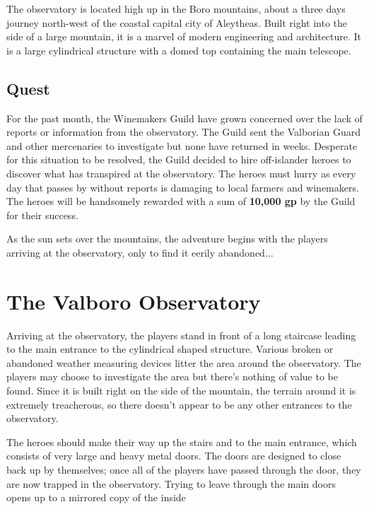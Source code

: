 \documentclass{article}
\begin{document}
\begin{multicols*}{2}
		The observatory is located high up in the Boro mountains, about a three days journey north-west of the coastal capital city of Aleytheas. Built right into the side of a large mountain, it is a marvel of modern engineering and architecture. It is a large cylindrical structure with a domed top containing the main telescope.
		
		\subsection*{Quest}
		For the past month, the Winemakers Guild have grown concerned over the lack of reports or information from the observatory. The Guild sent the Valborian Guard and other mercenaries to investigate but none have returned in weeks. Desperate for this situation to be resolved, the Guild decided to hire off-islander heroes to discover what has transpired at the observatory. The heroes must hurry as every day that passes by without reports is damaging to local farmers and winemakers. The heroes will be handsomely rewarded with a sum of \textbf{10,000 gp} by the Guild for their success.
		
		As the sun sets over the mountains, the adventure begins with the players arriving at the observatory, only to find it eerily abandoned...
		
	\section{The Valboro Observatory}
		Arriving at the observatory, the players stand in front of a long staircase leading to the main entrance to the cylindrical shaped structure. Various broken or abandoned weather measuring devices litter the area around the observatory. The players may choose to investigate the area but there's nothing of value to be found. Since it is built right on the side of the mountain, the terrain around it is extremely treacherous, so there doesn't appear to be any other entrances to the observatory.
		
		The heroes should make their way up the stairs and to the main entrance, which consists of very large and heavy metal doors. The doors are designed to close back up by themselves; once all of the players have passed through the door, they are now trapped in the observatory. Trying to leave through the main doors opens up to a mirrored copy of the inside 
		
		
	
	
\end{multicols*}
	
\end{document}
